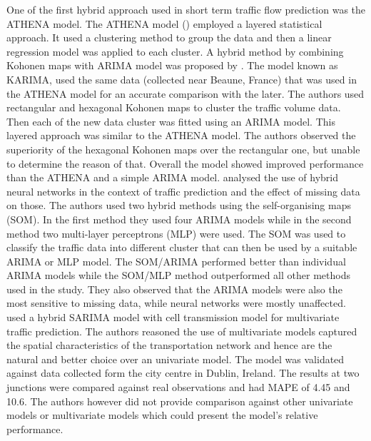 One of the first hybrid approach used in short term traffic flow prediction was the ATHENA model.
The ATHENA model (\citet{danech1991athena}) employed a layered statistical approach. It
used a clustering method to group the data and then a linear regression model was applied
to each cluster. A hybrid method by combining Kohonen maps with ARIMA model was proposed by
\citet{van1996combining}. The model known as KARIMA, used the same data (collected near Beaune,
France) that was used in the ATHENA model for an accurate comparison with the later. The authors
used rectangular and hexagonal Kohonen maps to cluster the traffic volume data. Then each of the
new data cluster was fitted using an ARIMA model. This layered approach was similar to the ATHENA
model. The authors observed the superiority of the hexagonal Kohonen maps over the rectangular one,
but unable to determine the reason of that. Overall the model showed improved performance than the
ATHENA and a simple ARIMA model. \citet{chen2001study} analysed the use of hybrid neural
networks in the context of traffic prediction and the effect of missing data on those.
The authors used two hybrid methods using the self-organising maps (SOM). In the first method they
used four ARIMA models while in the second method two multi-layer perceptrons (MLP) were used.
The SOM was used to classify the traffic data into different cluster that can then be used by a
suitable ARIMA or MLP model. The SOM/ARIMA performed better than individual ARIMA models while the
SOM/MLP method outperformed all other methods used in the study. They also observed that the ARIMA
models were also the most sensitive to missing data, while neural networks were mostly unaffected.
\citet{szeto2009multivariate} used a hybrid SARIMA model with cell transmission
model for multivariate traffic prediction. The authors reasoned the use of multivariate models
captured the spatial characteristics of the transportation network and hence are the natural
and better choice over an univariate model. The model was validated against data collected form
the city centre in Dublin, Ireland. The results at two junctions were compared against real
observations and had MAPE of 4.45 and 10.6. The authors however did not provide comparison
against other univariate models or multivariate models which could present the model's relative
performance.

